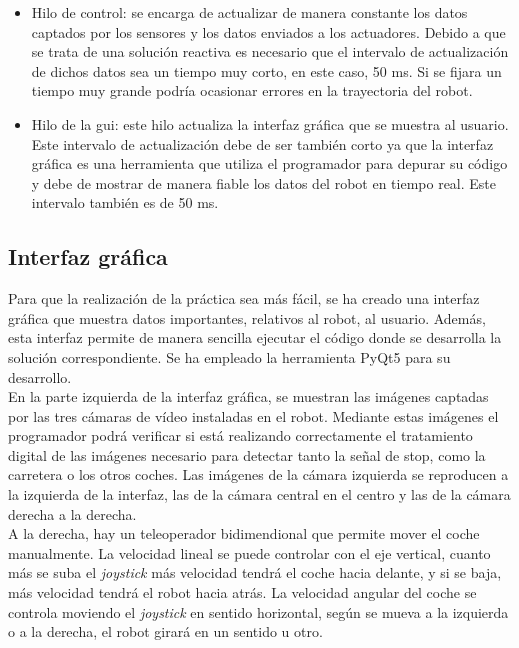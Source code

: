 \begin{itemize}
\item	Hilo de control: se encarga de actualizar de manera constante los datos captados por los sensores y los datos enviados a los actuadores. Debido a que se trata de una solución reactiva es necesario que el intervalo de actualización de dichos datos sea un tiempo muy corto, en este caso, 50 ms. Si se fijara un tiempo muy grande podría ocasionar errores en la trayectoria del robot.
\item	Hilo de la \acrshort{gui}: este hilo actualiza la interfaz gráfica que se muestra al usuario. Este intervalo de actualización debe de ser también corto ya que la interfaz gráfica es una herramienta que utiliza el programador para depurar su código y debe de mostrar de manera fiable los datos del robot en tiempo real. Este intervalo también es de 50 ms.
\end{itemize}


\subsection{Interfaz gráfica}
Para que la realización de la práctica sea más fácil, se ha creado una interfaz gráfica que muestra datos importantes, relativos al robot, al usuario. Además, esta interfaz permite de manera sencilla ejecutar el código donde se desarrolla la solución correspondiente. Se ha empleado la herramienta PyQt5 para su desarrollo.\\

En la parte izquierda de la interfaz gráfica, se muestran las imágenes captadas por las tres cámaras de vídeo instaladas en el robot. Mediante estas imágenes el programador podrá verificar si está realizando correctamente el tratamiento digital de las imágenes necesario para detectar tanto la señal de stop, como la carretera o los otros coches. Las imágenes de la cámara izquierda se reproducen a la izquierda de la interfaz, las de la cámara central en el centro y las de la cámara derecha a la derecha.\\

A la derecha, hay un teleoperador bidimendional que permite mover el coche manualmente. La velocidad lineal se puede controlar con el eje vertical, cuanto más se suba el \textit{joystick} más velocidad tendrá el coche hacia delante, y si se baja, más velocidad tendrá el robot hacia atrás. La velocidad angular del coche se controla moviendo el \textit{joystick} en sentido horizontal, según se mueva a la izquierda o a la derecha, el robot girará en un sentido u otro.\\

